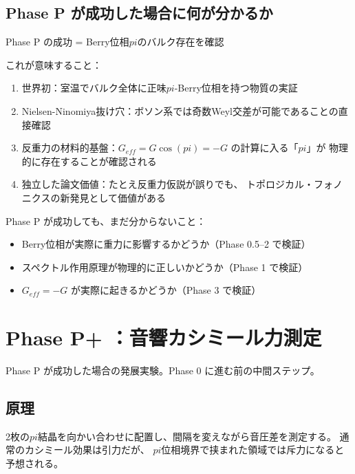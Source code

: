 \documentclass[11pt,a4paper]{article}
\def\pi{pi}%
\def\mathrm#1{#1}%
\def\textbf#1{#1}%
\begin{document}
\subsection{Phase P が成功した場合に何が分かるか}

\begin{tcolorbox}[colback=green!5,colframe=green!60!black,title=Phase P 成功の意味]
\textbf{Phase P の成功 = Berry位相$\pi$のバルク存在を確認}

これが意味すること：
\begin{enumerate}
\item \textbf{世界初}：室温でバルク全体に正味$\pi$-Berry位相を持つ物質の実証
\item \textbf{Nielsen-Ninomiya抜け穴}：ボソン系では奇数Weyl交差が可能であることの直接確認
\item \textbf{反重力の材料的基盤}：$G_{\mathrm{eff}} = G\cos(\pi) = -G$ の計算に入る「$\pi$」が
  物理的に存在することが確認される
\item \textbf{独立した論文価値}：たとえ反重力仮説が誤りでも、
  トポロジカル・フォノニクスの新発見として価値がある
\end{enumerate}
\end{tcolorbox}

\textbf{Phase P が成功しても、まだ分からないこと：}
\begin{itemize}
\item Berry位相が実際に重力に影響するかどうか（Phase 0.5--2 で検証）
\item スペクトル作用原理が物理的に正しいかどうか（Phase 1 で検証）
\item $G_{\mathrm{eff}} = -G$ が実際に起きるかどうか（Phase 3 で検証）
\end{itemize}


\section{Phase P+ ：音響カシミール力測定}

Phase P が成功した場合の発展実験。Phase 0 に進む前の中間ステップ。

\subsection{原理}

2枚の$\pi$結晶を向かい合わせに配置し、間隔を変えながら音圧差を測定する。
通常のカシミール効果は\textbf{引力}だが、
$\pi$位相境界で挟まれた領域では\textbf{斥力}になると予想される。
\end{document}
